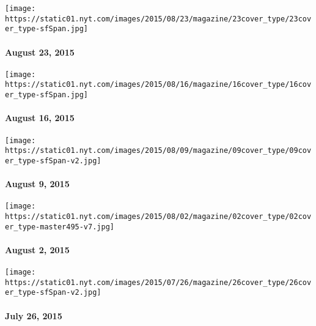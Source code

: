 \texttt{[image: https://static01.nyt.com/images/2015/08/23/magazine/23cover\_type/23cover\_type-sfSpan.jpg]}

\hypertarget{august-23-2015}{%
\paragraph{August 23, 2015}\label{august-23-2015}}

\href{http://www.nytimes.com/indexes/2015/08/16/magazine/index.html}{}

\texttt{[image: https://static01.nyt.com/images/2015/08/16/magazine/16cover\_type/16cover\_type-sfSpan.jpg]}

\hypertarget{august-16-2015}{%
\paragraph{August 16, 2015}\label{august-16-2015}}

\href{http://www.nytimes.com/indexes/2015/08/09/magazine/index.html}{}

\texttt{[image: https://static01.nyt.com/images/2015/08/09/magazine/09cover\_type/09cover\_type-sfSpan-v2.jpg]}

\hypertarget{august-9-2015}{%
\paragraph{August 9, 2015}\label{august-9-2015}}

\href{http://www.nytimes.com/indexes/2015/08/02/magazine/index.html}{}

\texttt{[image: https://static01.nyt.com/images/2015/08/02/magazine/02cover\_type/02cover\_type-master495-v7.jpg]}

\hypertarget{august-2-2015}{%
\paragraph{August 2, 2015}\label{august-2-2015}}

\href{http://www.nytimes.com/indexes/2015/07/26/magazine/index.html}{}

\texttt{[image: https://static01.nyt.com/images/2015/07/26/magazine/26cover\_type/26cover\_type-sfSpan-v2.jpg]}

\hypertarget{july-26-2015}{%
\paragraph{July 26, 2015}\label{july-26-2015}}

